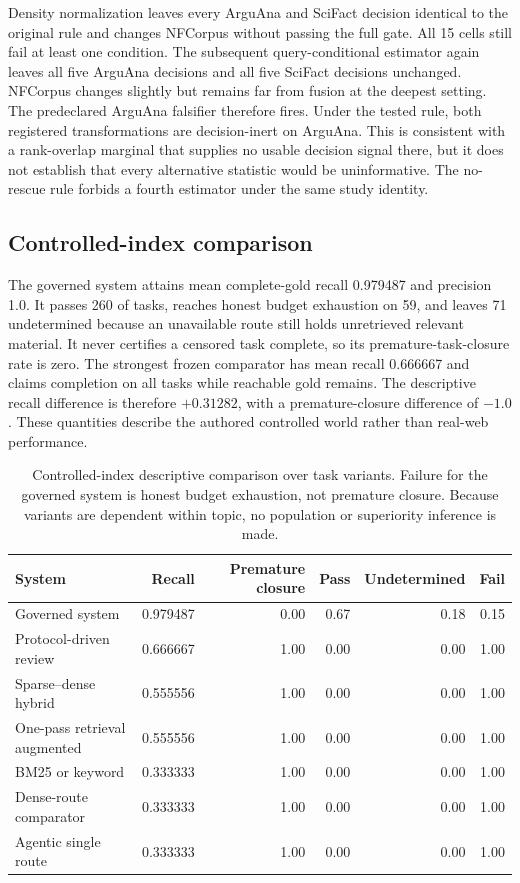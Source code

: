 Density normalization leaves every ArguAna and SciFact decision identical to
the original rule and changes NFCorpus without passing the full gate. All 15
cells still fail at least one condition. The subsequent query-conditional
estimator again leaves all five ArguAna decisions and all five SciFact decisions
unchanged. NFCorpus changes slightly but remains far from fusion at the deepest
setting. The predeclared ArguAna falsifier therefore fires. Under the tested
rule, both registered transformations are decision-inert on ArguAna. This is
consistent with a rank-overlap marginal that supplies no usable decision signal
there, but it does not establish that every alternative statistic would be
uninformative. The no-rescue rule forbids a fourth estimator under the same
study identity.

\subsection{Controlled-index comparison}
The governed system attains mean complete-gold recall 0.979487 and precision
1.0. It passes 260 of \OfflineTaskCount{} tasks, reaches honest budget exhaustion
on 59, and leaves 71 undetermined because an unavailable route still holds
unretrieved relevant material. It never certifies a censored task complete, so
its premature-task-closure rate is zero. The strongest frozen comparator has
mean recall 0.666667 and claims completion on all \OfflineTaskCount{} tasks while
reachable gold remains. The descriptive recall difference is therefore
$+0.31282$, with a premature-closure difference of $-1.0$. These quantities
describe the authored controlled world rather than real-web performance.

\begin{table}[t]
\centering
\small
\begin{tabular}{lrrrrr}
\hline
System & Recall & Premature closure & Pass & Undetermined & Fail \\
\hline
Governed system & 0.979487 & 0.00 & 0.67 & 0.18 & 0.15 \\
Protocol-driven review & 0.666667 & 1.00 & 0.00 & 0.00 & 1.00 \\
Sparse--dense hybrid & 0.555556 & 1.00 & 0.00 & 0.00 & 1.00 \\
One-pass retrieval augmented & 0.555556 & 1.00 & 0.00 & 0.00 & 1.00 \\
BM25 or keyword & 0.333333 & 1.00 & 0.00 & 0.00 & 1.00 \\
Dense-route comparator & 0.333333 & 1.00 & 0.00 & 0.00 & 1.00 \\
Agentic single route & 0.333333 & 1.00 & 0.00 & 0.00 & 1.00 \\
\hline
\end{tabular}
\caption{Controlled-index descriptive comparison over \OfflineTaskCount{} task
variants. Failure for the governed system is honest budget exhaustion, not
premature closure. Because variants are dependent within topic, no population
or superiority inference is made.}
\label{tab:p2-offline-main}
\end{table}

